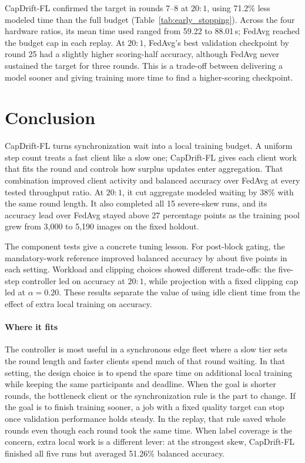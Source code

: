 \documentclass[conference]{IEEEtran}
\begin{document}
CapDrift-FL confirmed the target in rounds 7--8 at $20{:}1$, using 71.2\% less modeled time than the full budget (Table~\ref{tab:early_stopping}). Across the four hardware ratios, its mean time used ranged from 59.22 to 88.01\,s; FedAvg reached the budget cap in each replay. At $20{:}1$, FedAvg's best validation checkpoint by round 25 had a slightly higher scoring-half accuracy, although FedAvg never sustained the target for three rounds. This is a trade-off between delivering a model sooner and giving training more time to find a higher-scoring checkpoint.

\section{Conclusion}\label{sec:conclusion}
CapDrift-FL turns synchronization wait into a local training budget. A uniform step count treats a fast client like a slow one; CapDrift-FL gives each client work that fits the round and controls how surplus updates enter aggregation. That combination improved client activity and balanced accuracy over FedAvg at every tested throughput ratio. At $20{:}1$, it cut aggregate modeled waiting by 38\% with the same round length. It also completed all 15 severe-skew runs, and its accuracy lead over FedAvg stayed above 27 percentage points as the training pool grew from 3,000 to 5,190 images on the fixed holdout.

The component tests give a concrete tuning lesson. For post-block gating, the mandatory-work reference improved balanced accuracy by about five points in each setting. Workload and clipping choices showed different trade-offs: the five-step controller led on accuracy at $20{:}1$, while projection with a fixed clipping cap led at $\alpha=0.20$. These results separate the value of using idle client time from the effect of extra local training on accuracy.

\paragraph{Where it fits}
The controller is most useful in a synchronous edge fleet where a slow tier sets the round length and faster clients spend much of that round waiting. In that setting, the design choice is to spend the spare time on additional local training while keeping the same participants and deadline. When the goal is shorter rounds, the bottleneck client or the synchronization rule is the part to change. If the goal is to finish training sooner, a job with a fixed quality target can stop once validation performance holds steady. In the replay, that rule saved whole rounds even though each round took the same time. When label coverage is the concern, extra local work is a different lever: at the strongest skew, CapDrift-FL finished all five runs but averaged 51.26\% balanced accuracy.
\end{document}
